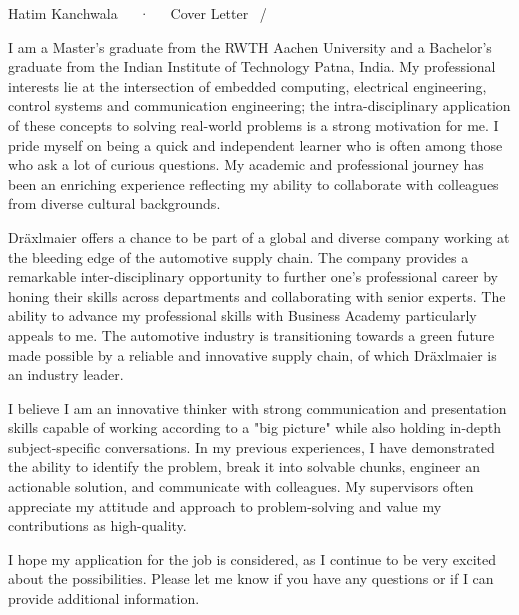 \documentclass[11pt, a4paper]{awesome-cv}
\begin{document}

\makecvheader[R]

\makecvfooter
  {}
  {Hatim Kanchwala~~~·~~~Cover Letter}
  {\thepage~/~\pageref{LastPage}}

\makelettertitle

\begin{cvletter}

I am a Master's graduate from the RWTH Aachen University and a Bachelor's graduate from the Indian Institute of Technology Patna, India. My professional interests lie at the intersection of embedded computing, electrical engineering, control systems and communication engineering; the intra-disciplinary application of these concepts to solving real-world problems is a strong motivation for me. I pride myself on being a quick and independent learner who is often among those who ask a lot of curious questions. My academic and professional journey has been an enriching experience reflecting my ability to collaborate with colleagues from diverse cultural backgrounds.

Dräxlmaier offers a chance to be part of a global and diverse company working at the bleeding edge of the automotive supply chain. The company provides a remarkable inter-disciplinary opportunity to further one's professional career by honing their skills across departments and collaborating with senior experts. The ability to advance my professional skills with Business Academy particularly appeals to me. The automotive industry is transitioning towards a green future made possible by a reliable and innovative supply chain, of which Dräxlmaier is an industry leader.

I believe I am an innovative thinker with strong communication and presentation skills capable of working according to a "big picture" while also holding in-depth subject-specific conversations. In my previous experiences, I have demonstrated the ability to identify the problem, break it into solvable chunks, engineer an actionable solution, and communicate with colleagues. My supervisors often appreciate my attitude and approach to problem-solving and value my contributions as high-quality.

I hope my application for the job is considered, as I continue to be very excited about the possibilities. Please let me know if you have any questions or if I can provide additional information.

\end{cvletter}


\makeletterclosing
\end{document}
